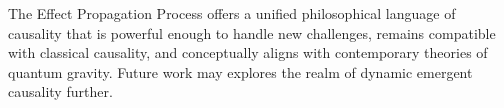 \documentclass{article}
\begin{document}
The Effect Propagation Process offers a unified philosophical language of causality that is powerful enough to handle new challenges, remains compatible with classical causality, and conceptually aligns with contemporary theories of quantum gravity. Future work may explores the realm of dynamic emergent causality further. 


\newpage

  
  
\end{document}
